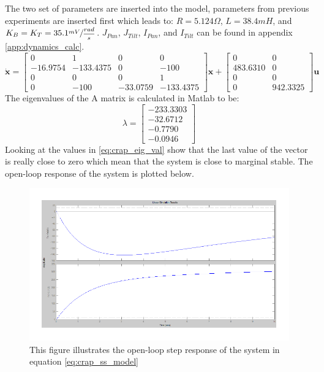 The two set of parameters are inserted into the model, parameters from previous experiments are inserted first which leads to: $R = 5.124\Omega$, $L = 38.4mH$, and $K_B = K_T = 35.1 \sfrac{mV}{\dfrac{rad}{s}}$. $J_{Pan}$, $J_{Tilt}$, $I_{Pan}$, and $I_{Tilt}$ can be found in appendix \ref{app:dynamics_calc}.
\begin{equation}
 \dot{\textbf{x}} =
 \begin{bmatrix}
   0 & 1 & 0 & 0\\
   - 16.9754 & - 133.4375 & 0 & - 100\\
   0 & 0 & 0 & 1\\
   0 & - 100 & - 33.0759 & - 133.4375
 \end{bmatrix}
 \textbf{x} +
 \begin{bmatrix}
   0 & 0\\
   483.6310 & 0\\
   0 & 0\\
   0 & 942.3325
 \end{bmatrix}
 \textbf{u}\label{eq:crap_ss_model}
\end{equation}
The eigenvalues of the A matrix is calculated in Matlab to be:
\begin{equation}
 \lambda =
 \begin{bmatrix}
   - 233.3303\\
   - 32.6712\\
   - 0.7790\\
   - 0.0946
 \end{bmatrix}\label{eq:crap_eig_val}
\end{equation}
Looking at the values in \ref{eq:crap_eig_val} show that the last value of the vector is really close to zero which mean that the system is close to marginal stable. The open-loop response of the system is plotted below.
\begin{figure}[htb]
	\begin{center}
	\includegraphics[scale=1,trim=0 0 0 0]{graphics/CrapSim.pdf} %
	\caption{This figure illustrates the open-loop step response of the system in equation \ref{eq:crap_ss_model}}
	\label{fig:crap_step}			%
	\end{center}
\end{figure}
